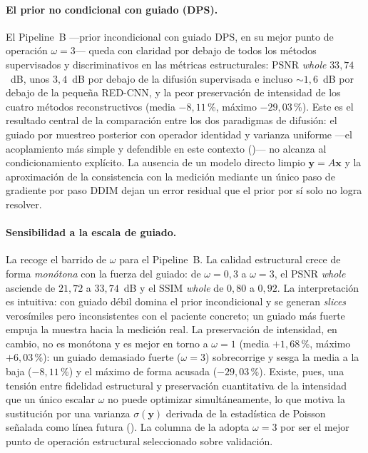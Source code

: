 \paragraph{El prior no condicional con guiado (DPS).}
El Pipeline~B —prior incondicional con guiado DPS, en su mejor punto
de operación $\omega = 3$— queda con claridad por debajo de todos
los métodos supervisados y discriminativos en las métricas
estructurales: PSNR \textit{whole} $33{,}74$~dB, unos $3{,}4$~dB por
debajo de la difusión supervisada e incluso $\sim 1{,}6$~dB por
debajo de la pequeña RED-CNN, y la peor preservación de intensidad de
los cuatro métodos reconstructivos (media $-8{,}11$\,\%, máximo
$-29{,}03$\,\%). Este es el resultado central de la comparación entre
los dos paradigmas de difusión: el guiado por muestreo posterior con
operador identidad y varianza uniforme —el acoplamiento más simple y
defendible en este contexto ()— no alcanza
al condicionamiento explícito. La ausencia de un modelo directo limpio
$\mathbf{y} = A\mathbf{x}$ y la aproximación de la consistencia con
la medición mediante un único paso de gradiente por paso DDIM dejan
un error residual que el prior por sí solo no logra resolver.

\paragraph{Sensibilidad a la escala de guiado.}
La  recoge el barrido de $\omega$ para el
Pipeline~B. La calidad estructural crece de forma \emph{monótona} con
la fuerza del guiado: de $\omega = 0{,}3$ a $\omega = 3$, el PSNR
\textit{whole} asciende de $21{,}72$ a $33{,}74$~dB y el SSIM
\textit{whole} de $0{,}80$ a $0{,}92$. La interpretación es intuitiva:
con guiado débil domina el prior incondicional y se generan
\textit{slices} verosímiles pero inconsistentes con el paciente
concreto; un guiado más fuerte empuja la muestra hacia la medición
real. La preservación de intensidad, en cambio, no es monótona y es
mejor en torno a $\omega = 1$ (media $+1{,}68$\,\%, máximo
$+6{,}03$\,\%): un guiado demasiado fuerte ($\omega = 3$) sobrecorrige
y sesga la media a la baja ($-8{,}11$\,\%) y el máximo de forma
acusada ($-29{,}03$\,\%). Existe, pues, una tensión entre fidelidad
estructural y preservación cuantitativa de la intensidad que un único
escalar $\omega$ no puede optimizar simultáneamente, lo que motiva la
sustitución por una varianza $\sigma(\mathbf{y})$ derivada de la
estadística de Poisson señalada como línea futura
(). La columna de la
 adopta $\omega = 3$ por ser el mejor punto
de operación estructural seleccionado sobre validación.

